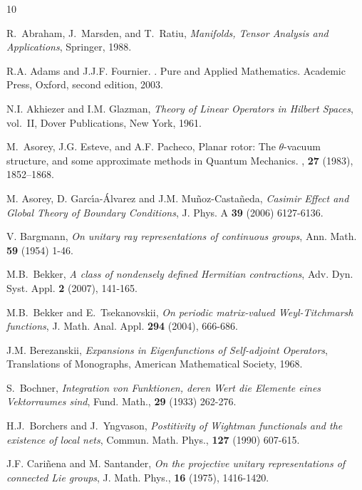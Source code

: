 \documentclass[a4paper,12pt]{amsart}
\newcommand{\1}{\mathbb{I}}
\numberwithin{equation}{section}
\numberwithin{theorem}{section}
\begin{document}
\begin{thebibliography}{10}

{\sc R.~Abraham, J.~Marsden, and T.~Ratiu}, {\em Manifolds, Tensor Analysis and
  Applications}, Springer, 1988.

{\sc R.A. Adams and J.J.F. Fournier}.
.
\newblock Pure and Applied Mathematics. Academic Press, Oxford, second edition,
  2003.

{\sc N.I. Akhiezer and I.M. Glazman}, 
{\em Theory of Linear Operators in {H}ilbert Spaces}, vol.~II, Dover Publications, New York, 1961.

{\sc M.~Asorey, J.G. Esteve, and A.F. Pacheco},
\newblock Planar rotor: The $\theta$-vacuum structure, and some approximate
  methods in {Q}uantum {M}echanics.
, {\bf 27} (1983), 1852--1868.

   {\sc M. Asorey, D. Garc\'{\i}a-\'Alvarez and J.M. Mu\~noz-Casta\~neda},
{\em Casimir Effect and Global Theory of Boundary Conditions},  J. Phys. A {\bf 39}  (2006) 6127-6136.

 {\sc V. Bargmann},  {\em On unitary ray representations of continuous groups}, 
Ann. Math. {\bf 59} (1954) 1-46.

{\sc M.B.~Bekker}, {\em A class of nondensely defined Hermitian contractions},
Adv. Dyn. Syst. Appl. {\bf 2} (2007), 141-165.

{\sc M.B.~Bekker and E.~Tsekanovskii}, {\em On periodic matrix-valued Weyl-Titchmarsh functions},
J. Math. Anal. Appl. {\bf 294} (2004), 666-686. 

{\sc J.M. Berezanskii}, {\em Expansions in Eigenfunctions of Self-adjoint
  Operators}, Translations of Monographs, American Mathematical Society, 1968.

{\sc S.~Bochner}, {\em Integration von Funktionen, deren Wert die Elemente
  eines Vektorraumes sind}, Fund. Math., {\bf 29} (1933) 262-276.

{\sc H.J.~Borchers and J.~Yngvason}, {\em Postitivity of Wightman functionals and the existence 
 of local nets}, Commun. Math. Phys., {\bf 127} (1990) 607-615.
 
{\sc J.F. Cari\~nena and M. Santander}, {\em On the projective unitary representations of connected Lie groups}, 
J. Math. Phys., {\bf 16} (1975), 1416-1420.


\end{thebibliography}
\end{document}
